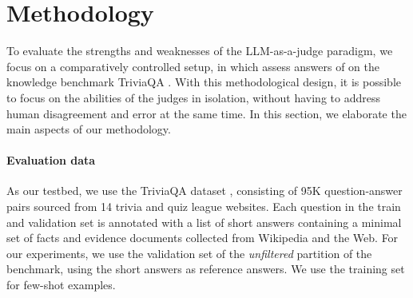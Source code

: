 \section{Methodology}\label{sec:methodology}


To evaluate the strengths and weaknesses of the LLM-as-a-judge paradigm, we focus on a comparatively controlled setup, in which \judgemodels assess answers of \evaluatormodels on the knowledge benchmark TriviaQA \citep{joshi2017triviaqa}.
With this methodological design, it is possible to focus on the abilities of the judges in isolation, without having to address human disagreement and error at the same time.
In this section, we elaborate the main aspects of our methodology.
\setlength{\parskip}{1pt}


\paragraph{Evaluation data}
%
As our testbed, we use the TriviaQA dataset \citep{joshi2017triviaqa}, consisting of 95K question-answer pairs sourced from 14 trivia and quiz league websites. 
Each question in the train and validation set is annotated with a list of short answers containing a minimal set of facts and evidence documents collected from Wikipedia and the Web.
For our experiments, we use the validation set of the \textit{unfiltered} partition of the benchmark, using the short answers as reference answers.
We use the training set for few-shot examples.

